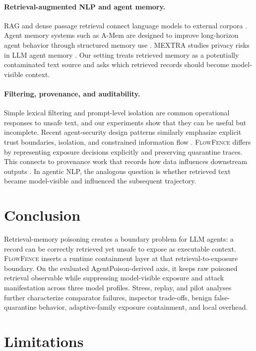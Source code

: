 \documentclass[11pt]{article}
\newcommand{\ff}{\textsc{FlowFence}\xspace}
\begin{document}
\paragraph{Retrieval-augmented NLP and agent memory.}
RAG and dense passage retrieval connect language models to external corpora \citep{lewis2020rag,dpr}. Agent memory systems such as A-Mem are designed to improve long-horizon agent behavior through structured memory use \citep{amem}. MEXTRA studies privacy risks in LLM agent memory \citep{mextra}. Our setting treats retrieved memory as a potentially contaminated text source and asks which retrieved records should become model-visible context.

\paragraph{Filtering, provenance, and auditability.}
Simple lexical filtering and prompt-level isolation are common operational responses to unsafe text, and our experiments show that they can be useful but incomplete. Recent agent-security design patterns similarly emphasize explicit trust boundaries, isolation, and constrained information flow \citep{beurerkellner2025designpatterns}. \ff differs by representing exposure decisions explicitly and preserving quarantine traces. This connects to provenance work that records how data influences downstream outputs \citep{buneman2001why,cheney2009provenance}. In agentic NLP, the analogous question is whether retrieved text became model-visible and influenced the subsequent trajectory.

\section{Conclusion}

Retrieval-memory poisoning creates a boundary problem for LLM agents: a record can be correctly retrieved yet unsafe to expose as executable context. \ff inserts a runtime containment layer at that retrieval-to-exposure boundary. On the evaluated AgentPoison-derived axis, it keeps raw poisoned retrieval observable while suppressing model-visible exposure and attack manifestation across three model profiles. Stress, replay, and pilot analyses further characterize comparator failures, inspector trade-offs, benign false-quarantine behavior, adaptive-family exposure containment, and local overhead.

\section*{Limitations}
\end{document}

